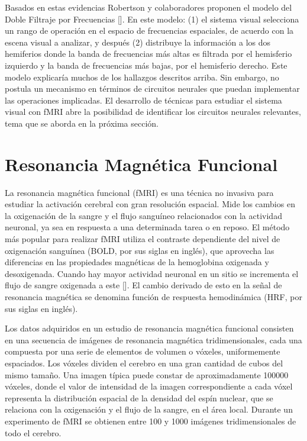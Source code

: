 Basados en estas evidencias Robertson y colaboradores proponen el modelo del Doble Filtraje por Frecuencias [\cite{robertson_hemispheric_2000}]. En este modelo: (1) el sistema visual selecciona un rango de operación en el espacio de frecuencias espaciales, de acuerdo con la escena visual a analizar, y  después (2) distribuye la información a los dos hemiferios donde la banda de frecuencias más altas es filtrada por el hemisferio izquierdo y la banda de frecuencias más bajas, por el hemisferio derecho. Este modelo explicaría muchos de los hallazgos descritos arriba. Sin embargo, no postula un mecanismo en términos de circuitos neurales que puedan implementar las operaciones implicadas. El desarrollo de técnicas para estudiar el sistema visual con fMRI abre la posibilidad de identificar los circuitos neurales relevantes, tema que se aborda en la próxima sección.

\section{Resonancia Magn\'etica Funcional}

La resonancia magnética funcional (fMRI) es una técnica no invasiva para estudiar la activación cerebral con gran resoluci\'on espacial. Mide los cambios en la oxigenación de la sangre y el flujo sanguíneo relacionados con la actividad neuronal, ya sea en respuesta a una determinada tarea o en reposo. El método más popular para realizar fMRI utiliza el contraste dependiente del nivel de oxigenación sanguínea (BOLD, por sus siglas en ingl\'es), que aprovecha las diferencias en las propiedades magnéticas de la hemoglobina oxigenada y desoxigenada. Cuando hay mayor actividad neuronal en un sitio se incrementa el flujo de sangre oxigenada a este [\cite{lindquist_principles_nodate}]. El cambio derivado de esto en la señal de resonancia magnética se denomina función de respuesta hemodinámica (HRF, por sus siglas en ingl\'es).

Los datos adquiridos en un estudio de resonancia magnética funcional consisten en una secuencia de imágenes de resonancia magnética tridimensionales, cada una compuesta por una serie de elementos de volumen o vóxeles, uniformemente espaciados. Los vóxeles dividen el cerebro en una gran cantidad de cubos del mismo tamaño. Una imagen típica puede constar de aproximadamente 100000 vóxeles, donde el valor de intensidad de la imagen correspondiente a cada vóxel representa la distribución espacial de la densidad del espín nuclear, que se relaciona con la oxigenación y el flujo de la sangre, en el área local. Durante un experimento de fMRI se obtienen entre 100 y 1000 imágenes tridimensionales de todo el cerebro. 

